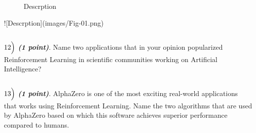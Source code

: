 \documentclass[11pt]{article}
\makeatletter
\newcommand{\boxspacing}{\kern\kvtcb@left@rule\kern\kvtcb@boxsep}
\newcommand{\prompt}[4]{
        {\ttfamily\llap{{\color{#2}[#3]:\hspace{3pt}#4}}\vspace{-\baselineskip}}
    }
\makeatother
\begin{document}
\begin{figure}
\centering
{}
\caption{Descrption}
\end{figure}
![Descrption](images/Fig-01.png)
    \begin{tcolorbox}[breakable, size=fbox, boxrule=1pt, pad at break*=1mm,colback=cellbackground, colframe=cellborder]
\prompt{In}{incolor}{ }{\boxspacing}
\begin{Verbatim}[commandchars=\\\{\}]

\end{Verbatim}
\end{tcolorbox}

    \(12\Bigl)\) \textbf{\emph{(1 point)}}. Name two applications that in
your opinion popularized Reinforcement Learning in scientific
communities working on Artificial Intelligence?

    \begin{tcolorbox}[breakable, size=fbox, boxrule=1pt, pad at break*=1mm,colback=cellbackground, colframe=cellborder]
\prompt{In}{incolor}{ }{\boxspacing}
\begin{Verbatim}[commandchars=\\\{\}]

\end{Verbatim}
\end{tcolorbox}

    \(13\Bigl)\) \textbf{\emph{(1 point)}}. AlphaZero is one of the most
exciting real-world applications that works using Reinforcement
Learning. Name the two algorithms that are used by AlphaZero based on
which this software achieves superior performance compared to humans.

    \begin{tcolorbox}[breakable, size=fbox, boxrule=1pt, pad at break*=1mm,colback=cellbackground, colframe=cellborder]
\prompt{In}{incolor}{ }{\boxspacing}
\begin{Verbatim}[commandchars=\\\{\}]

\end{Verbatim}
\end{tcolorbox}
\end{document}
